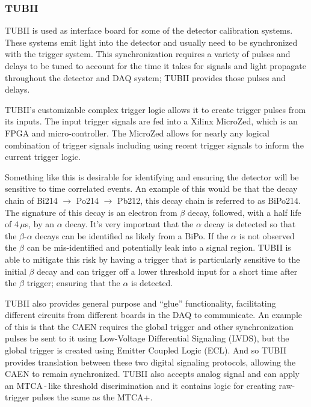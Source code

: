\subsubsection{TUBII}
\label{sec:tubii}
TUBII is used as interface board for some of the detector calibration systems.
These systems emit light into the detector and usually need to be
synchronized with the trigger system. This synchronization requires
a variety of pulses and delays to be tuned to account for the time it
takes for signals and light propagate throughout the detector and DAQ
system; TUBII provides those pulses and delays.

TUBII's customizable complex trigger logic
allows it to create trigger pulses from its inputs.
The input trigger signals are fed into a Xilinx MicroZed, which is an FPGA and
micro-controller.
The MicroZed allows for nearly any logical combination of trigger signals including
using recent trigger signals to inform the current trigger logic.

Something like this is desirable for identifying and ensuring the detector will
be sensitive to time correlated events. An example of this would be that
the decay chain of Bi214 $\rightarrow$ Po214 $\rightarrow$ Pb212, this decay chain is referred to as BiPo214. %
The signature of this decay is an electron from $\beta$ decay, followed, with a half
life of 4\,$\mu$s, by an $\alpha$ decay.
It's very important that the $\alpha$ decay is detected so that the $\beta$-$\alpha$
decays can be identified as likely from a BiPo. If the $\alpha$ is not observed
the $\beta$ can be mis-identified and potentially leak into a signal region.
TUBII is able to mitigate this risk by having a trigger that is particularly
sensitive to the initial $\beta$ decay and can trigger off a lower
threshold input for a short time after the $\beta$ trigger; ensuring that
the $\alpha$ is detected.

TUBII also provides general purpose and ``glue'' functionality,
facilitating different circuits from different boards in the DAQ to communicate.
An example of this is that the CAEN requires the global trigger and
other synchronization pulses be sent to it using Low-Voltage Differential
Signaling (LVDS), but the global trigger is created using Emitter Coupled
Logic (ECL).
And so TUBII provides translation between these two digital signaling protocols,
allowing the CAEN to remain synchronized.
TUBII also accepts analog signal and can apply an MTCA\,-\,like threshold
discrimination and it contains logic for creating raw-trigger pulses the
same as the MTCA+.

